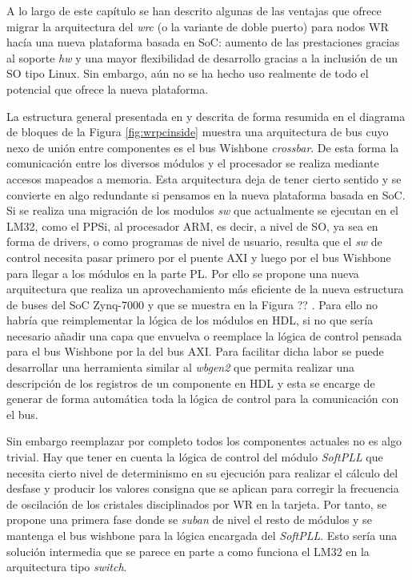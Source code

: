 A lo largo de este capítulo se han descrito algunas de las ventajas que ofrece 
migrar la arquitectura del \textit{wrc} (o la variante de doble puerto) para 
nodos WR hacía una nueva plataforma basada en SoC: aumento de las prestaciones 
gracias al soporte \textit{hw} y una mayor flexibilidad de desarrollo gracias a 
la inclusión de un SO tipo Linux. Sin embargo, aún no se ha hecho uso realmente 
de todo el potencial que ofrece la nueva plataforma.

La estructura general presentada en \cite{Daniluk2012} y descrita de forma 
resumida en el diagrama de bloques de la Figura \ref{fig:wrpcinside} muestra 
una arquitectura de bus cuyo nexo de unión entre componentes es el bus Wishbone 
\textit{crossbar}. De esta forma la comunicación entre los diversos módulos y 
el procesador se realiza mediante accesos mapeados a memoria. Esta arquitectura 
deja de tener cierto sentido y se convierte en algo redundante si pensamos en 
la nueva plataforma basada en SoC. Si se realiza una migración de los modulos 
\textit{sw} que actualmente se ejecutan en el LM32, como el PPSi, al procesador 
ARM, es decir, a nivel de SO, ya sea en forma de drivers, o como programas de 
nivel de usuario, resulta que el \textit{sw} de control  necesita pasar primero 
por el puente AXI y luego por el bus Wishbone para llegar a los módulos en la 
parte PL. Por ello se propone una nueva arquitectura que realiza un 
aprovechamiento más eficiente de la nueva estructura de buses del SoC Zynq-7000 
y que se muestra en la Figura ?? . Para ello no habría que reimplementar 
la lógica de los módulos en HDL, si no que sería necesario añadir una capa que 
envuelva o reemplace la lógica de control pensada para el bus Wishbone por la 
del bus AXI. Para facilitar dicha labor se puede desarrollar una herramienta 
similar al \textit{wbgen2} que permita realizar una descripción de los 
registros de un componente en HDL y esta se encarge de generar de forma 
automática toda la lógica de control para la comunicación con el bus.


Sin embargo reemplazar por completo todos los componentes actuales no es algo 
trivial. Hay que tener en cuenta la lógica de control del módulo 
\textit{SoftPLL} que necesita cierto nivel de determinismo en su ejecución para 
realizar el cálculo del desfase y producir los valores consigna que se aplican 
para corregir la frecuencia de oscilación de los cristales disciplinados por WR 
en la tarjeta. Por tanto, se propone una primera fase donde se \textit{suban} 
de nivel el resto de módulos y se mantenga el bus wishbone para la lógica 
encargada del \textit{SoftPLL}. Esto sería una solución intermedia que se 
parece en parte a como funciona el LM32 en la arquitectura tipo \textit{switch}.

